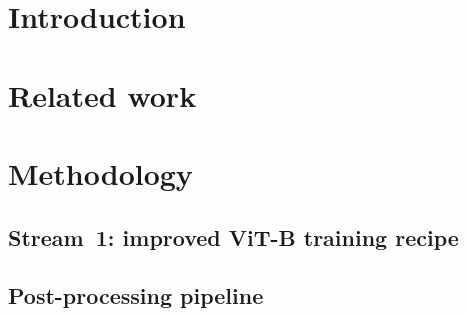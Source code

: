 \documentclass[10pt,a4paper]{article}
\begin{document}
\vspace{1.2em}

\section{Introduction}
\label{sec:intro}








\section{Related work}
\label{sec:related}











\section{Methodology}
\label{sec:method}



\subsection{Stream~1: improved ViT-B training recipe}









\subsection{Post-processing pipeline}

\end{document}
